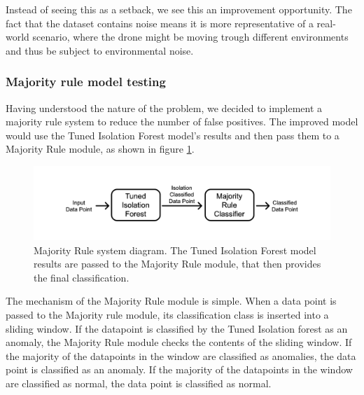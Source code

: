 \documentclass[futureinternet,article,submit,pdftex,moreauthors]{Definitions/mdpi}
\begin{document}
Instead of seeing this as a setback, we see this an improvement opportunity. The fact that the dataset contains noise means it is more representative of a real-world scenario, where the drone might be moving trough different environments and thus be subject to environmental noise.

\subsubsection{Majority rule model testing} \label{sec:majorityRuleModelTesting}

Having understood the nature of the problem, we decided to implement a majority rule system to reduce the number of false positives. The improved model would use the Tuned Isolation Forest model's results and then pass them to a Majority Rule module, as shown in figure \ref{fig:MajorityRuleDiagram}. 

\begin{figure}[H]
	\includegraphics[width=12.5 cm]{img/ModulesStructure.jpg}
	\caption{Majority Rule system diagram. The Tuned Isolation Forest model results are passed to the Majority Rule module, that then provides the final classification.}
	\label{fig:MajorityRuleDiagram}
	\end{figure}   
\unskip

The mechanism of the Majority Rule module is simple. When a data point is passed to the Majority rule module, its classification class is inserted into a sliding window. If the datapoint is classified by the Tuned Isolation forest as an anomaly, the Majority Rule module checks the contents of the sliding window. If the 
majority of the datapoints in the window are classified as anomalies, the data point is classified as an anomaly. If the majority of the datapoints in the window are classified as normal, the data point is classified as normal.
\end{document}
